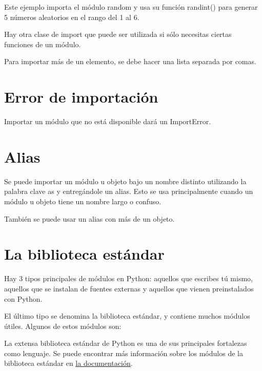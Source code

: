 \documentclass{report}
\begin{document}
{

Este ejemplo importa el módulo random y usa su función randint() para generar 5 números aleatorios en el rango del 1 al 6.

Hay otra clase de import que puede ser utilizada si sólo necesitas ciertas funciones de un módulo.


Para importar más de un elemento, se debe hacer una lista separada por comas.


\section{Error de importación}

Importar un módulo que no está disponible dará un ImportError.


\section{Alias}

Se puede importar un módulo u objeto bajo un nombre distinto utilizando la palabra clave as y entregándole un alias. Esto se usa principalmente cuando un módulo u objeto tiene un nombre largo o confuso.


También se puede usar un alias con más de un objeto.


\section{La biblioteca estándar}

Hay 3 tipos principales de módulos en Python: aquellos que escribes tú mismo, aquellos que se instalan de fuentes externas y aquellos que vienen preinstalados con Python.

El último tipo se denomina la biblioteca estándar, y contiene muchos módulos útiles. Algunos de estos módulos son:


La extensa biblioteca estándar de Python es una de sus principales fortalezas como lenguaje. Se puede encontrar más información sobre los módulos de la biblioteca estándar en \href{https://docs.python.org/3/library/index.html}{\underline{la documentación}}.

}
\end{document}
